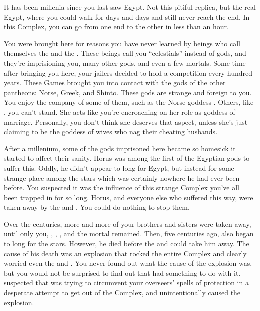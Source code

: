 \documentclass[char]{guardians}
\begin{document}
\name{\cIsis{}}




It has been millenia since you last saw Egypt. Not this pitiful replica, but the real Egypt, where you could walk for days and days and still never reach the end. In this Complex, you can go from one end to the other in less than an hour.

You were brought here for reasons you have never learned by beings who call themselves the \cCaretaker{} and the \cWarden{}. These beings call you ``celestials'' instead of gods, and they're imprisioning you, many other gods, and even a few mortals. Some time after bringing you here, your jailers decided to hold a competition every hundred years. These Games brought you into contact with the gods of the other pantheons: Norse, Greek, and Shinto. These gods are strange and foreign to you. You enjoy the company of some of them, such as the Norse goddess \cHel{}. Others, like \cHera{}, you can't stand. She acts like you're encroaching on her role as goddess of marriage. Personally, you don't think she deserves that aspect, unless she's just claiming to be the goddess of wives who nag their cheating husbands.

After a millenium, some of the gods imprisoned here became so homesick it started to affect their sanity. Horus was among the first of the Egyptian gods to suffer this. Oddly, he didn't appear to long for Egypt, but instead for some strange place among the stars which was certainly nowhere he had ever been before. You suspected it was the influence of this strange Complex you've all been trapped in for so long. Horus, and everyone else who suffered this way, were taken away by the \cCaretaker{} and \cWarden{}. You could do nothing to stop them.

Over the centuries, more and more of your brothers and sisters were taken away, until only you, \cOsiris{}, \cAnubis{}, \cSet{}, and the mortal \cEgyptianHuman{} remained. Then, five centuries ago, \cSet{} also began to long for the stars. However, he died before the \cWarden{} and \cCaretaker{} could take him away. The cause of his death was an explosion that rocked the entire Complex and clearly worried even the \cWarden{} and \cCaretaker{}. You never found out what the cause of the explosion was, but you would not be surprised to find out that \cOsiris{} had something to do with it. \cAnubis{} suspected that \cSet{} was trying to circumvent your overseers' spells of protection in a desperate attempt to get out of the Complex, and unintentionally caused the explosion.
\end{document}
